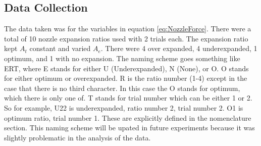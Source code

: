 \subsection{Data Collection}
The data taken was for the variables in equation \ref{eq:NozzleForce}. There were a total of 10 nozzle expansion ratios used with 2 trials each. The expansion ratio kept $A_t$ constant and varied $A_e$. There were 4 over expanded, 4 underexpanded, 1 optimum, and 1 with no expansion. The naming scheme goes something like ERT, where E stands for either U (Underexpanded), N (None), or O. O stands for either optimum or overexpanded. R is the ratio number (1-4) except in the case that there is no third character. In this case the O stands for optimum, which there is only one of. T stands for trial number which can be either 1 or 2. So for example, U22 is underexpanded, ratio number 2, trial number 2. O1 is optimum ratio, trial number 1. These are explicitly defined in the nomenclature section.%
%
%
%
%
%
%
%
%
%
%
%
%
%
%
%
%
%
%
%
This naming scheme will be upated in future experiments because it was slightly problematic in the analysis of the data.
